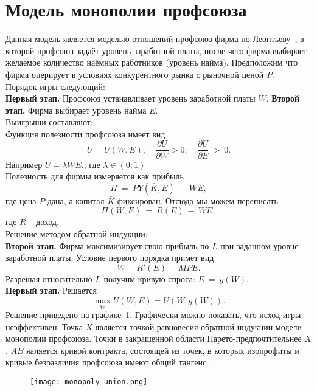 \section{Модель монополии профсоюза}
\label{sec:monopoly}

Данная модель является моделью отношений профсоюз-фирма по Леонтьеву~\cite{LeontiefW}, в которой профсоюз задаёт уровень заработной платы, после чего фирма выбирает желаемое количество наёмных работников (уровень найма). Предположим что фирма оперирует в условиях конкурентного рынка с рыночной ценой $P$.\\

Порядок игры следующий:\\
\textbf{Первый этап.} Профсоюз устанавливает уровень заработной платы $W$.
\textbf{Второй этап.} Фирма выбирает уровень найма $E$.\\

Выигрыши составляют:\\
Функция полезности профсоюза имеет вид 
$$ U = U(W,E), \quad \frac{\partial U}{\partial W} > 0; \quad \frac{\partial U}{\partial E}~>~0.$$ 
Например $U = \lambda WE.$, где $\lambda \in (0; 1)$\\
Полезность для фирмы измеряется как прибыль 
$$\Pi~=~PY(\bar K,E)~-~WE,$$ 
где цена $P$ дана, а капитал $\bar K$ фиксирован. Отсюда мы можем переписать 
$$\Pi(W,E)~=~R(E)~-~WE,$$ 
где $R$ -- доход.\\

Решение методом обратной индукции:\\
\textbf{Второй этап.} Фирма максимизирует свою прибыль по $L$ при заданном уровне заработной платы. Условие первого порядка примет вид
$$ W = R'(E) = MPE. $$
Разрешая относительно $L$ получим кривую спроса: $E~=~g(W)$.\\
\textbf{Первый этап.} Решается
$$ \max_W U(W,E) = U(W,g(W)). $$
Решение приведено на графике~\ref{fig:monopoly_union}. Графически можно показать, что исход игры неэффективен. Точка $X$ является точкой равновесия обратной индукции модели монополии профсоюза. Точки в закрашенной области Парето-предпочтительнее $X$. $AB$ яаляется кривой контракта, состоящей из точек, в которых изопрофиты и кривые безразличия профсоюза имеют общий тангенс~\cite{ShandongUniver}.


\begin{figure}[h]
		\texttt{[image: monopoly\_union.png]}
		\caption{}
		\label{fig:monopoly_union}
\end{figure}

